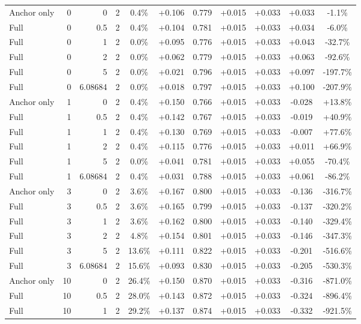 \begin{table}[htbp]
\begin{tabular}{lrrrccccccc}
Anchor only & 0 & 0 & 2 & 0.4\% & +0.106 & 0.779 & +0.015 & +0.033 & +0.033 & -1.1\% \\
Full & 0 & 0.5 & 2 & 0.4\% & +0.104 & 0.781 & +0.015 & +0.033 & +0.034 & -6.0\% \\
Full & 0 & 1 & 2 & 0.0\% & +0.095 & 0.776 & +0.015 & +0.033 & +0.043 & -32.7\% \\
Full & 0 & 2 & 2 & 0.0\% & +0.062 & 0.779 & +0.015 & +0.033 & +0.063 & -92.6\% \\
Full & 0 & 5 & 2 & 0.0\% & +0.021 & 0.796 & +0.015 & +0.033 & +0.097 & -197.7\% \\
Full & 0 & 6.08684 & 2 & 0.0\% & +0.018 & 0.797 & +0.015 & +0.033 & +0.100 & -207.9\% \\
Anchor only & 1 & 0 & 2 & 0.4\% & +0.150 & 0.766 & +0.015 & +0.033 & -0.028 & +13.8\% \\
Full & 1 & 0.5 & 2 & 0.4\% & +0.142 & 0.767 & +0.015 & +0.033 & -0.019 & +40.9\% \\
Full & 1 & 1 & 2 & 0.4\% & +0.130 & 0.769 & +0.015 & +0.033 & -0.007 & +77.6\% \\
Full & 1 & 2 & 2 & 0.4\% & +0.115 & 0.776 & +0.015 & +0.033 & +0.011 & +66.9\% \\
Full & 1 & 5 & 2 & 0.0\% & +0.041 & 0.781 & +0.015 & +0.033 & +0.055 & -70.4\% \\
Full & 1 & 6.08684 & 2 & 0.4\% & +0.031 & 0.788 & +0.015 & +0.033 & +0.061 & -86.2\% \\
Anchor only & 3 & 0 & 2 & 3.6\% & +0.167 & 0.800 & +0.015 & +0.033 & -0.136 & -316.7\% \\
Full & 3 & 0.5 & 2 & 3.6\% & +0.165 & 0.799 & +0.015 & +0.033 & -0.137 & -320.2\% \\
Full & 3 & 1 & 2 & 3.6\% & +0.162 & 0.800 & +0.015 & +0.033 & -0.140 & -329.4\% \\
Full & 3 & 2 & 2 & 4.8\% & +0.154 & 0.801 & +0.015 & +0.033 & -0.146 & -347.3\% \\
Full & 3 & 5 & 2 & 13.6\% & +0.111 & 0.822 & +0.015 & +0.033 & -0.201 & -516.6\% \\
Full & 3 & 6.08684 & 2 & 15.6\% & +0.093 & 0.830 & +0.015 & +0.033 & -0.205 & -530.3\% \\
Anchor only & 10 & 0 & 2 & 26.4\% & +0.150 & 0.870 & +0.015 & +0.033 & -0.316 & -871.0\% \\
Full & 10 & 0.5 & 2 & 28.0\% & +0.143 & 0.872 & +0.015 & +0.033 & -0.324 & -896.4\% \\
Full & 10 & 1 & 2 & 29.2\% & +0.137 & 0.874 & +0.015 & +0.033 & -0.332 & -921.5\% \\

\end{tabular}
\end{table}
